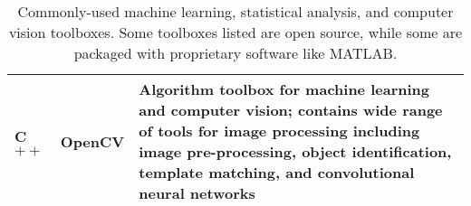 \begin{table*}
\begin{center}
\begin{tabular}{p{3cm}|p{3.5cm}|p{11cm}}
	  C $++$ & OpenCV & Algorithm toolbox for machine learning and computer vision; contains wide range of tools for image processing including image pre-processing, object identification, template matching, and convolutional neural networks\\

            \bottomrule
        \end{tabular}
        \caption{Commonly-used machine learning, statistical analysis, and computer vision toolboxes. Some toolboxes listed are open source, while some are packaged with proprietary software like MATLAB.}
        \label{data_tools}
    \end{center}
\end{table*}

